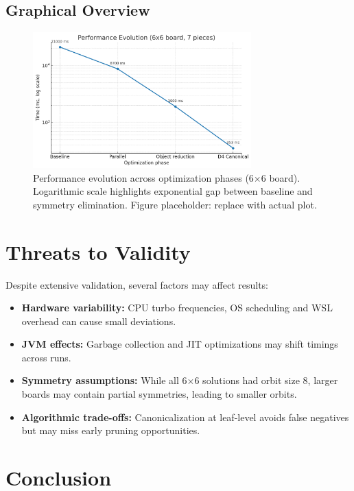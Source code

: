 \documentclass[12pt,a4paper]{article}
\theoremstyle{definition}
\begin{document}
\subsection{Graphical Overview}

\begin{figure}[h]
\centering
\includegraphics[width=0.75\textwidth]{performance_trend.png}
\caption{Performance evolution across optimization phases (6$\times$6 board). 
Logarithmic scale highlights exponential gap between baseline and symmetry elimination. 
Figure placeholder: replace with actual plot.}
\end{figure}

\section{Threats to Validity}

Despite extensive validation, several factors may affect results:

\begin{itemize}
\item \textbf{Hardware variability:} CPU turbo frequencies, OS scheduling and WSL overhead can cause small deviations.
\item \textbf{JVM effects:} Garbage collection and JIT optimizations may shift timings across runs.
\item \textbf{Symmetry assumptions:} While all 6$\times$6 solutions had orbit size 8, larger boards may contain partial symmetries, leading to smaller orbits.
\item \textbf{Algorithmic trade-offs:} Canonicalization at leaf-level avoids false negatives but may miss early pruning opportunities.
\end{itemize}

\section{Conclusion}
\end{document}
